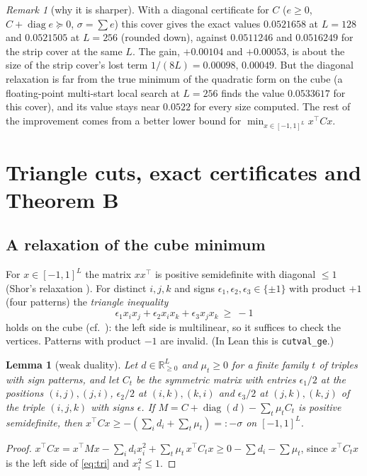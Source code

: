 \documentclass[11pt]{amsart}
\newtheorem{lemma}[theorem]{Lemma}
\theoremstyle{remark}
\newtheorem{remark}[theorem]{Remark}
\newcommand{\R}{\mathbb{R}}
\begin{document}
\begin{remark}[why it is sharper]
With a diagonal certificate for $C$ ($e\ge0$, $C+\operatorname{diag}e\succeq0$, $\sigma=\sum e$) this cover gives the exact values $0.0521658$ at $L=128$ and $0.0521505$ at $L=256$ (rounded down), against $0.0511246$ and $0.0516249$ for the strip cover at the same $L$. The gain,
$+0.00104$ and $+0.00053$, is about the size of the strip cover's lost term $1/(8L)=0.00098,\,0.00049$. But the diagonal relaxation is far from the true minimum of the quadratic form on the cube (a floating-point multi-start local search at $L=256$ finds the value $0.0533617$ for this cover), and its value stays near $0.0522$
for every size computed. The rest of the improvement comes from a better lower bound for $\min_{x\in[-1,1]^L}x^{\top}Cx$.
\end{remark}

\section{Triangle cuts, exact certificates and Theorem B}\label{sec:cert}

\subsection{A relaxation of the cube minimum}
For $x\in[-1,1]^L$ the matrix $xx^{\top}$ is positive semidefinite with diagonal $\le1$ (Shor's relaxation \cite{Shor87}). For distinct $i,j,k$ and signs $\epsilon_1,\epsilon_2,\epsilon_3\in\{\pm1\}$ with product $+1$ (four patterns) the \emph{triangle inequality}
\begin{equation}\label{eq:tri}
\epsilon_1x_ix_j+\epsilon_2x_ix_k+\epsilon_3x_jx_k\ \ge\ -1
\end{equation}
holds on the cube (cf.\ \cite{Padberg89}): the left side is multilinear, so it suffices to check the vertices. Patterns with product $-1$ are invalid. (In Lean this is \texttt{cutval\_ge}.)

\begin{lemma}[weak duality]\label{lem:dual}
Let $d\in\R^L_{\ge0}$ and $\mu_t\ge0$ for a finite family $t$ of triples with sign patterns, and let $C_t$ be the symmetric matrix with entries $\epsilon_1/2$ at the positions $(i,j),(j,i)$, $\epsilon_2/2$ at $(i,k),(k,i)$ and $\epsilon_3/2$ at $(j,k),(k,j)$ of the triple $(i,j,k)$ with signs $\epsilon$. If
$M=C+\operatorname{diag}(d)-\sum_t\mu_tC_t$ is positive semidefinite, then $x^{\top}Cx\ge-(\sum_id_i+\sum_t\mu_t)=:-\sigma$ on $[-1,1]^L$.
\end{lemma}
\begin{proof}
$x^{\top}Cx=x^{\top}Mx-\sum_id_ix_i^2+\sum_t\mu_t\,x^{\top}C_tx\ge0-\sum d_i-\sum\mu_t$, since $x^{\top}C_tx$ is the left side of \eqref{eq:tri} and $x_i^2\le1$.
\end{proof}
\end{document}
